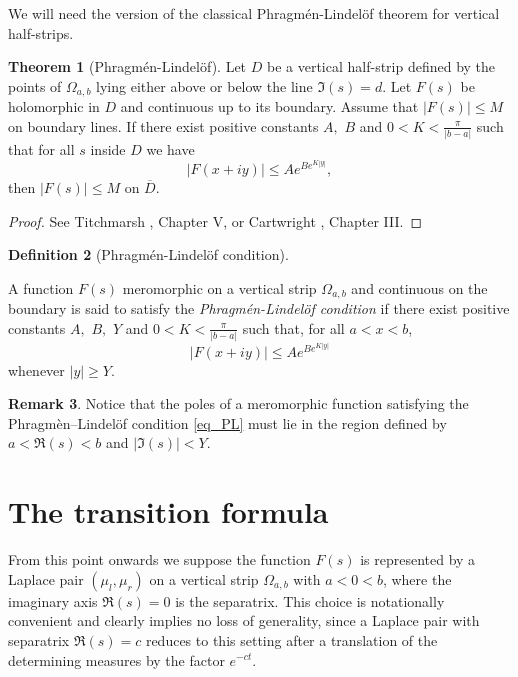 \documentclass[12pt]{article}
\theoremstyle{definition}
\newtheorem{theorem}{Theorem}[section]
\newtheorem{definition}[theorem]{Definition}
\newtheorem{remark}[theorem]{Remark}
\begin{document}
We will need the version of the classical Phragmén-Lindelöf theorem for vertical half-strips.

\begin{theorem}[Phragmén-Lindelöf]\label{thm:lindaloffi} Let $D$ be a vertical half-strip defined by the points of $\Omega_{a,b}$ lying either above or below the line $\Im(s)=d.$ Let $F(s)$ be holomorphic in $D$ and continuous up to its boundary. Assume that \( |F(s) | \leq M\) on boundary lines. If there exist positive constants $A,$ $B$ and $0<K< \frac{\pi}{|b-a|}$ such that for all $s$ inside $D$ we have \[ \label{eq:prePL}|F(x+iy)| \leq Ae^{Be^{K|y|}  } , \] 
then $|F(s)| \leq M$ on $\overline{D}.$

\end{theorem}

\begin{proof}
   See Titchmarsh \cite{TitchmarshFunction}, Chapter V,  or Cartwright \cite{Cartwright}, Chapter III.
\end{proof} 

 \begin{definition}[Phragm\'{e}n-Lindel\"{o}f condition] \label{def:PL}
     
    A function $F(s)$ meromorphic  
     on a vertical strip $\Omega_{a,b}$ and continuous on the boundary is said to satisfy the {\em Phragm\'{e}n-Lindel\"{o}f condition} if there exist positive constants $A,$ $B,$ $Y$ and $0<K<\frac{\pi}{|b-a|}$  such that, for all $a<x<b$,
     \begin{equation}
     \label{eq_PL}
         |F(x+iy)| \leq Ae^{Be^{K|y|}} 
     \end{equation}
     whenever $|y| \geq Y.$
 \end{definition}

\begin{remark}\label{def:containnopoles}
    Notice that the poles of a meromorphic function satisfying the Phragmèn--Lindelöf condition \eqref{eq_PL} must lie in the region defined by $a< \Re(s)<b$ and $|\Im(s)| < Y.$
\end{remark}

\section{The transition formula}
   \label{sec_transition_formula}

From this point onwards we suppose the function \( F(s) \) is represented by a Laplace pair \( (\mu_l,\mu_r) \) on a vertical strip \( \Omega_{a,b} \) with \( a < 0 < b \), where the imaginary axis \( \Re ( s) = 0 \) is the separatrix. This choice is notationally convenient and clearly implies no loss of generality, since a Laplace pair with separatrix \( \Re (s) = c \) reduces to this setting after a translation of the determining measures by the factor \( e^{-ct} \).
\end{document}
